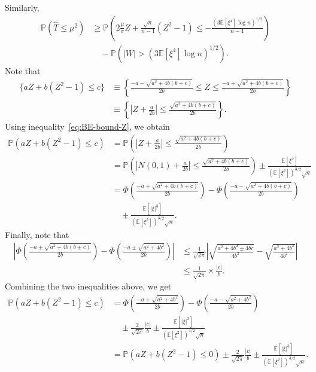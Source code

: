 \documentclass{article}
\numberwithin{myalgctr}{section}
\begin{document}
Similarly,
\begin{equation}\label{eq:more-median-bias}
\begin{split}
\mathbb{P}(\widehat{T} \le \mu^2) &\ge \mathbb{P}\left(2\frac{\mu}{\sigma} Z + \frac{\sqrt{n}}{n-1}(Z^2 - 1) \le -\frac{(3\mathbb{E}[\xi^4]\log n)^{1/2}}{n-1}\right)\\ 
&\quad- \mathbb{P}(|W| > (3\mathbb{E}[\xi^4]\log n)^{1/2}).
\end{split}
\end{equation}
Note that
\begin{equation}\label{eq:event-equivalence}
\begin{split}
\{a Z + b(Z^2 - 1) \le c\} &\equiv \left\{\frac{-a - \sqrt{a^2 + 4b(b+c)}}{2b} \le Z \le \frac{-a + \sqrt{a^2 + 4b(b+c)}}{2b}\right\}\\
&\equiv \left\{\left|Z + \frac{a}{2b}\right| \le \frac{\sqrt{a^2 + 4b(b + c)}}{2b}\right\}.
\end{split}
\end{equation}
Using inequality~\eqref{eq:BE-bound-Z}, we obtain
\begin{align*}
\mathbb{P}\left(a Z + b(Z^2 - 1) \le c\right) &= \mathbb{P}\left(\left|Z + \frac{a}{2b}\right| \le \frac{\sqrt{a^2 + 4b(b + c)}}{2b}\right)\\
&= \mathbb{P}\left(\left|N(0, 1) + \frac{a}{2b}\right| \le \frac{\sqrt{a^2 + 4b(b + c)}}{2b}\right) \pm \frac{\mathbb{E}[\xi^3]}{(\mathbb{E}[\xi^2])^{3/2}\sqrt{n}}\\
&= \Phi\left(\frac{-a + \sqrt{a^2 + 4b(b+c)}}{2b}\right) - \Phi\left(\frac{-a-\sqrt{a^2 + 4b(b+c)}}{2b}\right)\\ 
&\quad\pm \frac{\mathbb{E}[|\xi|^3]}{(\mathbb{E}[\xi^2])^{3/2}\sqrt{n}}.
\end{align*}
Finally, note that
\begin{align*}
\left|\Phi\left(\frac{-a \pm \sqrt{a^2 + 4b(b\pm c)}}{2b}\right) - \Phi\left(\frac{-a \pm \sqrt{a^2 + 4b^2}}{2b}\right)\right| &\le \frac{1}{\sqrt{2\pi}}\left|\sqrt{\frac{a^2 + 4b^2 \pm 4bc}{4b^2}} - \sqrt{\frac{a^2 + 4b^2}{4b^2}}\right|\\
&\le \frac{1}{\sqrt{2\pi}}\times\frac{|c|}{b}. 
\end{align*}
Combining the two inequalities above, we get
\begin{equation}\label{eq:final-inequality-quadratic}
\begin{split}
\mathbb{P}\left(a Z + b(Z^2 - 1) \le c\right) &= \Phi\left(\frac{-a + \sqrt{a^2 + 4b^2}}{2b}\right) - \Phi\left(\frac{-a-\sqrt{a^2 + 4b^2}}{2b}\right)\\
&\quad\pm \frac{2}{\sqrt{2\pi}}\frac{|c|}{b} \pm \frac{\mathbb{E}[|\xi|^3]}{(\mathbb{E}[\xi^2])^{3/2}\sqrt{n}}\\
&= \mathbb{P}(aZ + b(Z^2 - 1) \le 0) \pm \frac{2}{\sqrt{2\pi}}\frac{|c|}{b} \pm \frac{\mathbb{E}[|\xi|^3]}{(\mathbb{E}[\xi^2])^{3/2}\sqrt{n}}.
\end{split}
\end{equation}
\end{document}

